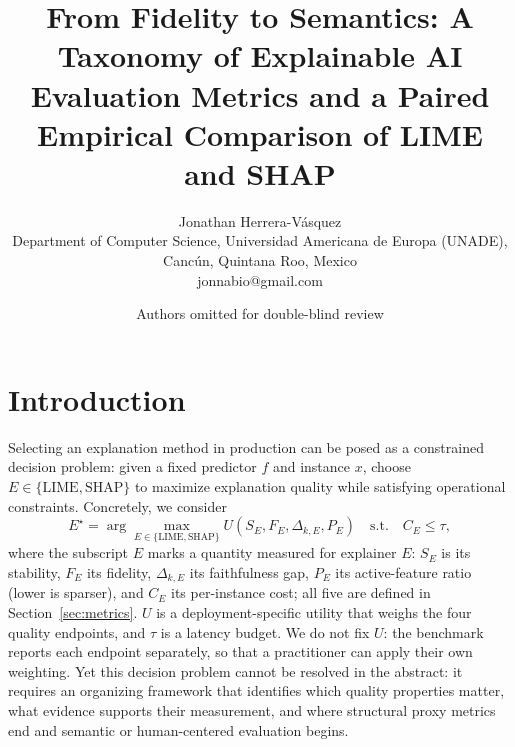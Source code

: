 \documentclass[10pt,a4paper,twoside]{article}
\title{From Fidelity to Semantics: A Taxonomy of Explainable AI Evaluation
Metrics and a Paired Empirical Comparison of LIME and SHAP}
\author{Jonathan Herrera-V\'asquez
\smallskip \\
\small{Department of Computer Science, Universidad Americana de Europa (UNADE),
Canc\'un, Quintana Roo, Mexico\\
jonnabio@gmail.com}}
\author{\small{Authors omitted for double-blind review}}
\date{}
\begin{document}
\medskip
\maketitle

\pagestyle{Rest}
\thispagestyle{FirstPage}
\smallskip



\medskip



\section{Introduction}
\label{sec:intro}

Selecting an explanation method in production can be posed as a
constrained decision problem: given a fixed predictor $f$ and instance
$x$, choose $E \in \{\mathrm{LIME}, \mathrm{SHAP}\}$ to maximize
explanation quality while satisfying operational constraints. Concretely,
we consider
\begin{equation}
E^\star = \arg\max_{E \in \{\mathrm{LIME},\mathrm{SHAP}\}}
U(S_E, F_E, \Delta_{k,E}, P_E)
\quad\text{s.t.}\quad C_E \le \tau,
\label{eq:decision}
\end{equation}
where the subscript $E$ marks a quantity measured for explainer $E$:
$S_E$ is its stability, $F_E$ its fidelity, $\Delta_{k,E}$ its
faithfulness gap, $P_E$ its active-feature ratio (lower is sparser), and
$C_E$ its per-instance cost; all five are defined in
Section~\ref{sec:metrics}. $U$ is a deployment-specific utility that
weighs the four quality endpoints, and $\tau$ is a latency budget.
We do not fix $U$: the benchmark reports each endpoint separately, so
that a practitioner can apply their own weighting. Yet this decision
problem cannot be resolved in the abstract: it requires an organizing
framework that identifies which quality properties matter, what evidence
supports their measurement, and where structural proxy metrics end and
semantic or human-centered evaluation begins.
\end{document}
